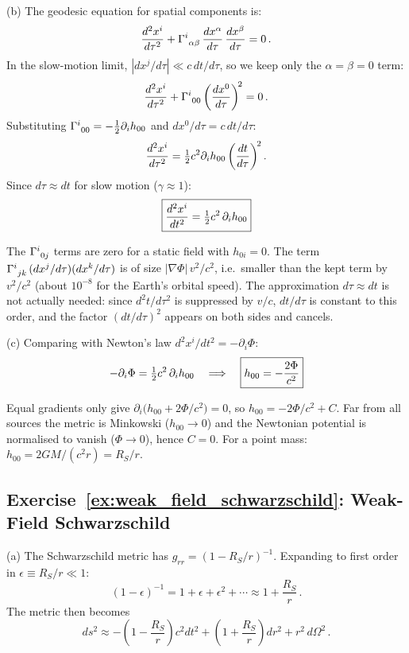 (b) The geodesic equation for spatial components is:
\[
    \frac{d^2 x^i}{d\tau^2}
    + \Gamma^{i}_{\ \alpha \beta}\,
    \frac{dx^\alpha}{d\tau}\, \frac{dx^\beta}{d\tau} = 0 \,.
\]
In the slow-motion limit, $|dx^j/d\tau| \ll c\,dt/d\tau$, so we keep
only the $\alpha = \beta = 0$ term:
\[
    \frac{d^2 x^i}{d\tau^2}
    + \Gamma^{i}_{\ 0 0}\left(\frac{dx^0}{d\tau}\right)^{\!2} = 0 \,.
\]
Substituting $\Gamma^{i}_{\ 0 0} = -\tfrac{1}{2} \partial_i h_{00}$ and
$dx^0/d\tau = c\, dt/d\tau$:
\[
    \frac{d^2 x^i}{d\tau^2}
    = \tfrac{1}{2} c^2 \partial_i h_{00}\left(\frac{dt}{d\tau}\right)^{\!2} .
\]
Since $d\tau \approx dt$ for slow motion ($\gamma \approx 1$):
\[
    \boxed{\frac{d^2 x^i}{dt^2} = \tfrac{1}{2} c^2\, \partial_i h_{00}}
\]

\begin{annotation}
The $\Gamma^{i}_{\ 0 j}$ terms are zero for a static field with
$h_{0i} = 0$.
The term $\Gamma^{i}_{\ j k}\,(dx^j/d\tau)(dx^k/d\tau)$ is of size
$|\nabla\Phi|\,v^2/c^2$, i.e.\ smaller than the kept term by
$v^2/c^2$ (about $10^{-8}$ for the Earth's orbital speed).
The approximation $d\tau \approx dt$ is not actually needed: since
$d^2t/d\tau^2$ is suppressed by $v/c$, $dt/d\tau$ is constant to
this order, and the factor $(dt/d\tau)^2$ appears on both sides
and cancels.
\end{annotation}


(c) Comparing with Newton's law $d^2 x^i/dt^2 = -\partial_i \Phi$:
\[
    -\partial_i \Phi = \tfrac{1}{2} c^2\, \partial_i h_{00}
    \quad\Longrightarrow\quad
    \boxed{h_{00} = -\frac{2\Phi}{c^2}}
\]

\begin{derivation}
Equal gradients only give $\partial_i\bigl(h_{00} + 2\Phi/c^2\bigr) = 0$, so
$h_{00} = -2\Phi/c^2 + C$.  Far from all sources the metric is Minkowski
($h_{00} \to 0$) and the Newtonian potential is normalised to vanish
($\Phi \to 0$), hence $C = 0$.  For a point mass:
$h_{00} = 2GM/(c^2r) = R_S/r$.
\end{derivation}


\subsection*{Exercise~\ref{ex:weak_field_schwarzschild}: Weak-Field Schwarzschild}

(a) The Schwarzschild metric has
$g_{rr} = (1 - R_S/r)^{-1}$.  Expanding to first order in
$\epsilon \equiv R_S/r \ll 1$:
\[
    (1 - \epsilon)^{-1} = 1 + \epsilon + \epsilon^2 + \cdots
    \approx 1 + \frac{R_S}{r} \,.
\]
The metric then becomes
\[
    ds^2 \approx -\left(1 - \frac{R_S}{r}\right) c^2 dt^2
    + \left(1 + \frac{R_S}{r}\right) dr^2
    + r^2\, d\Omega^2 \,.
\]


